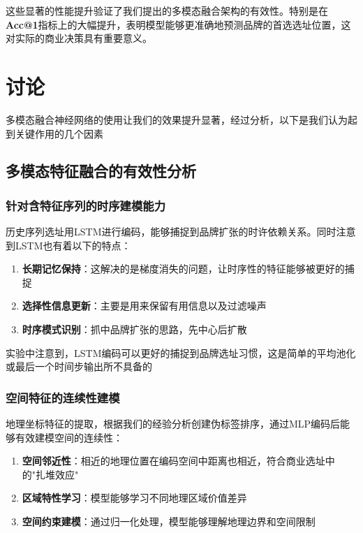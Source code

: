 \documentclass{article}
\begin{document}
这些显著的性能提升验证了我们提出的多模态融合架构的有效性。特别是在\textbf{Acc@1}指标上的大幅提升，表明模型能够更准确地预测品牌的首选选址位置，这对实际的商业决策具有重要意义。

\section{讨论}

多模态融合神经网络的使用让我们的效果提升显著，经过分析，以下是我们认为起到关键作用的几个因素

\subsection{多模态特征融合的有效性分析}

\subsubsection{针对含特征序列的时序建模能力}

历史序列选址用LSTM进行编码，能够捕捉到品牌扩张的时许依赖关系。同时注意到LSTM也有着以下的特点：

\begin{enumerate}
\item \textbf{长期记忆保持}：这解决的是梯度消失的问题，让时序性的特征能够被更好的捕捉
\item \textbf{选择性信息更新}：主要是用来保留有用信息以及过滤噪声
\item \textbf{时序模式识别}：抓中品牌扩张的思路，先中心后扩散
\end{enumerate}

实验中注意到，LSTM编码可以更好的捕捉到品牌选址习惯，这是简单的平均池化或最后一个时间步输出所不具备的

\subsubsection{空间特征的连续性建模}

地理坐标特征的提取，根据我们的经验分析创建伪标签排序，通过MLP编码后能够有效建模空间的连续性：

\begin{enumerate}
\item \textbf{空间邻近性}：相近的地理位置在编码空间中距离也相近，符合商业选址中的"扎堆效应"
\item \textbf{区域特性学习}：模型能够学习不同地理区域价值差异
\item \textbf{空间约束建模}：通过归一化处理，模型能够理解地理边界和空间限制
\end{enumerate}
\end{document}
